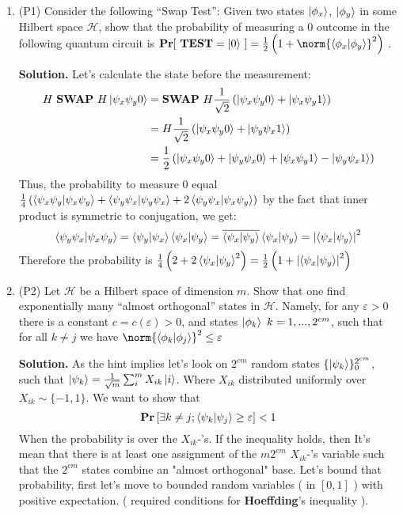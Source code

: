 \documentclass{article}
\begin{document}
\begin{enumerate}
    \item (P1) Consider the following “Swap Test”: Given two states \( \ket{\phi_x}\), \( \ket{\phi_y}\) in some Hilbert space \( \mathcal{H}\),
show that the probability of measuring a \(0\) outcome in the following quantum circuit is \( \mathbf{Pr} [ \mathbf{ \ TEST} = \ket{0} \   ]  =  \frac{1}{2} \left(1 + \norm{\braket{\phi_x| \phi_y}}^2 \right) \) .

\textbf{Solution.} Let's calculate the state before the measurement: 
\[ \begin{split}
    H \ \mathbf{SWAP} \ H \ket{\psi_x \psi_y 0} & = \mathbf{SWAP} \ H \frac{1}{\sqrt{2}}\left( \ket{\psi_x \psi_y 0} + \ket{\psi_x \psi_y 1}\right) \\
    & = H \frac{1}{\sqrt{2}}\left( \ket{\psi_x \psi_y 0} + \ket{\psi_y \psi_x 1}\right)\\ &= \frac{1}{2}\left(  \ket{\psi_x \psi_y 0} + \ket{\psi_y \psi_x 0}  + \ket{\psi_x \psi_y 1} - \ket{\psi_y \psi_x 1}\right)
\end{split}  \]
Thus, the probability to measure \( 0 \) equal \( \frac{1}{4}\left(  \braket{ \psi_x \psi_y | \psi_x \psi_y } + \braket{\psi_y \psi_x | \psi_y \psi_x } + 2 \braket{\psi_y \psi_x|\psi_x \psi_y} \right) \)
by the fact that inner product is symmetric to conjugation, we get: 
\[ \braket{\psi_y \psi_x|\psi_x \psi_y} = \braket{\psi_y | \psi_x}\braket{\psi_x | \psi_y} = \overline{\braket{\psi_x | \psi_y}}\braket{\psi_x | \psi_y} = \left| \braket{\psi_x | \psi_y}\right|^2 \] Therefore the probability is \( \frac{1}{4}\left(2 + 2 \braket{\psi_x | \psi_y}^2 \right) =  \frac{1}{2}\left(1 +  \left|\braket{\psi_x | \psi_y}\right|^2 \right)   \)  

\item  (P2) Let \( \mathcal{H}\) be a Hilbert space of dimension \(m\). Show that one find exponentially many “almost orthogonal” states in \( \mathcal{H}\). Namely, for any \( \varepsilon > 0 \)   there is a constant \(c = c(\varepsilon) > 0 \), and states \( \ket{\phi_k} \ k = 1,...,2^{cm} \), such that for all \(k \neq j \) we have \( \norm{\braket{\phi_k| \phi_j}}^2 \le \varepsilon \) 


\textbf{Solution.} As the hint implies let's look on \( 2^{cm} \) random states \( \{ \ket{\psi_k} \}_{0}^{2^{cm}}\), such that \( \ket{\psi_k} = \frac{1}{\sqrt{m}}\sum_{i}^{m}{X_{ik}\ket{i}} \). Where \( X_{ik} \) distributed uniformly over \(X_{ik} \sim  \{ -1 , 1 \} \). We want to show that \[
\mathbf{Pr} \left[ \exists k \neq j ; \braket{\psi_k| \psi_j} \ge \varepsilon \right] < 1 \] When the probability is over the \( X_{ik} \)-'s. If the inequality holds, then It's mean that there is at least one assignment of the \( m2^{cm} \) \(X_{ik}\)-'s variable such that the \( 2^{cm} \) states combine an "almost orthogonal" base. Let's bound that probability, first let's move to bounded random variables ( in \( [0,1] \) ) with positive expectation. ( required conditions for \textbf{Hoeffding}'s inequality ).  


\end{enumerate}
\end{document}
